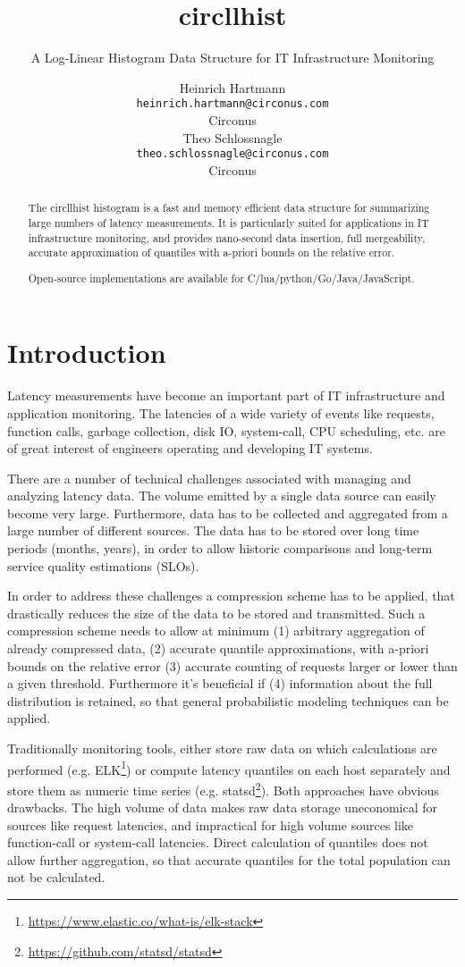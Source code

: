 \documentclass{article}
\title{circllhist}
\subtitle{A Log-Linear Histogram Data Structure for IT Infrastructure Monitoring}
\author{
  Heinrich Hartmann \\
  \texttt{heinrich.hartmann@circonus.com} \\
  Circonus \\
  \And
  Theo Schlossnagle \\
  \texttt{theo.schlossnagle@circonus.com} \\
  Circonus
}
\theoremstyle{plain}
\theoremstyle{remark}
\begin{document}
\maketitle

\begin{abstract}
  The circllhist histogram is a fast and memory efficient data structure for summarizing large
  numbers of latency measurements.  It is particularly suited for applications in IT infrastructure
  monitoring, and provides nano-second data insertion, full mergeability, accurate approximation of
  quantiles with a-priori bounds on the relative error.

  Open-source implementations are available for C/lua/python/Go/Java/JavaScript.
\end{abstract}

\section{Introduction}

Latency measurements have become an important part of IT infrastructure and application monitoring.
The latencies of a wide variety of events like requests, function calls, garbage collection, disk
IO, system-call, CPU scheduling, etc. are of great interest of engineers operating and developing IT systems.

There are a number of technical challenges associated with managing and analyzing latency data.  The
volume emitted by a single data source can easily become very large.  Furthermore, data has to be
collected and aggregated from a large number of different sources.  The data has to be stored over
long time periods (months, years), in order to allow historic comparisons and long-term service
quality estimations (SLOs).

In order to address these challenges a compression scheme has to be applied, that drastically
reduces the size of the data to be stored and transmitted.  Such a compression scheme needs to allow
at minimum (1) arbitrary aggregation of already compressed data, (2) accurate quantile
approximations, with a-priori bounds on the relative error (3) accurate counting of requests larger
or lower than a given threshold. Furthermore it's beneficial if (4) information about the full
distribution is retained, so that general probabilistic modeling techniques can be applied.

Traditionally monitoring tools, either store raw data on which calculations are performed (e.g.
ELK\footnote{\url{https://www.elastic.co/what-is/elk-stack}}) or compute latency quantiles on each host
separately and store them as numeric time series
(e.g. statsd\footnote{\url{https://github.com/statsd/statsd}}).  Both approaches have obvious
drawbacks.  The high volume of data makes raw data storage uneconomical for sources like request
latencies, and impractical for high volume sources like function-call or system-call latencies.
Direct calculation of quantiles does not allow further aggregation, so that accurate quantiles for
the total population can not be calculated.
\end{document}
